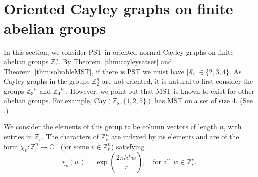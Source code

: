 \documentclass{amsart}
\theoremstyle{plain}
\theoremstyle{remark}\newtheorem{con}[theorem]{Construction}
\theoremstyle{remark} \newtheorem*{remark}{Remark}
\theoremstyle{remark} \newtheorem{example}{Example}
\newcommand{\bb}{\mathbb}
\newcommand{\mrm}{\mathrm}
\newcommand{\cS}{\mathcal{S}}
\newcommand{\abs}[1]{|#1|}
\begin{document}
\section{Oriented Cayley graphs on finite abelian groups}\label{sec:abelian}

In this section, we consider PST
in oriented normal Cayley graphs on finite abelian groups $\bb{Z}_r^n$.  By Theorem~\ref{thm:cayleysatset} and Theorem~\ref{thm:solvableMST}, if there is PST
we must have $\abs{\cS_e}\in \{2,3,4\}$. As Cayley graphs in the groups $\bb{Z}_2^n$ are not oriented,
it is natural to first consider the groups ${\mathbb Z_3}^n$ and ${\mathbb Z_4}^n$ . However, we point out that MST is known to exist for other abelian groups. For example, $\mrm{Cay}(\mathbb Z_8,\{1,2,5\})$ has MST on a set of size 4. (See \cite[10.2. Example 6]{godsil2024oriented}.)

We consider the elements of this group to be column vectors of length $n$, with entries in $\bb{Z}_{r}$. The characters of $\bb{Z}_{r}^{n}$ are indexed by its elements and are of the form $\chi_{v}: \bb{Z}_{r}^{n} \to \bb{C}^{\times}$ (for some $v\in \bb{Z}_{r}^{n}$) satisfying 
\begin{equation*}
    \chi_{v}(w)= \exp\left( \dfrac{2\pi i v^{t}w}{r} \right), \quad \text{for all $w \in \bb{Z}_{r}^{n}$.}  
\end{equation*}
\end{document}

